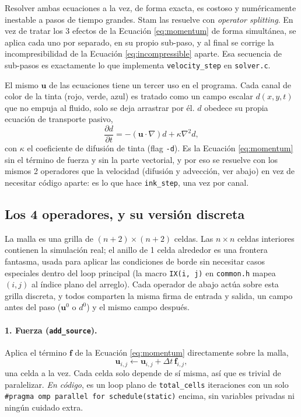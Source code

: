 \documentclass[11pt]{article}
\begin{document}
Resolver ambas ecuaciones a la vez, de forma exacta, es costoso y
numéricamente inestable a pasos de tiempo grandes. Stam \cite{stam1999}
las resuelve con \emph{operator splitting}. En vez de tratar los 3
efectos de la Ecuación \ref{eq:momentum} de forma simultánea, se aplica
cada uno por separado, en su propio sub-paso, y al final se corrige la
incompresibilidad de la Ecuación \ref{eq:incompressible} aparte. Esa
secuencia de sub-pasos es exactamente lo que implementa
\texttt{velocity\_step} en \texttt{solver.c}.

El mismo $\mathbf{u}$ de las ecuaciones tiene un tercer uso en el
programa. Cada canal de color de la tinta (rojo, verde, azul) es tratado
como un campo escalar $d(x, y, t)$ que no empuja al fluido, solo se deja
arrastrar por él. $d$ obedece su propia ecuación de transporte pasivo,
\[
\frac{\partial d}{\partial t} = -(\mathbf{u} \cdot \nabla) d + \kappa \nabla^2 d,
\]
con $\kappa$ el coeficiente de difusión de tinta (flag \texttt{-d}). Es
la Ecuación \ref{eq:momentum} sin el término de fuerza y sin la parte
vectorial, y por eso se resuelve con los mismos 2 operadores que la
velocidad (difusión y advección, ver abajo) en vez de necesitar código
aparte: es lo que hace \texttt{ink\_step}, una vez por canal.

\subsection{Los 4 operadores, y su versión discreta}

La malla es una grilla de $(n+2) \times (n+2)$ celdas. Las $n \times n$
celdas interiores contienen la simulación real; el anillo de 1 celda
alrededor es una frontera fantasma, usada para aplicar las condiciones de
borde sin necesitar casos especiales dentro del loop principal (la macro
\texttt{IX(i, j)} en \texttt{common.h} mapea $(i, j)$ al índice plano del
arreglo). Cada operador de abajo actúa sobre esta grilla discreta, y
todos comparten la misma firma de entrada y salida, un campo antes del
paso ($\mathbf{u}^0$ o $d^0$) y el mismo campo después.

\paragraph{1. Fuerza (\texttt{add\_source}).} Aplica el término
$\mathbf{f}$ de la Ecuación \ref{eq:momentum} directamente sobre la
malla,
\[
\mathbf{u}_{i,j} \leftarrow \mathbf{u}_{i,j} + \Delta t \, \mathbf{f}_{i,j},
\]
una celda a la vez. Cada celda solo depende de sí misma, así que es
trivial de paralelizar. \emph{En código}, es un loop plano de
\texttt{total\_cells} iteraciones con un solo
\texttt{\#pragma omp parallel for schedule(static)} encima, sin
variables privadas ni ningún cuidado extra.
\end{document}
